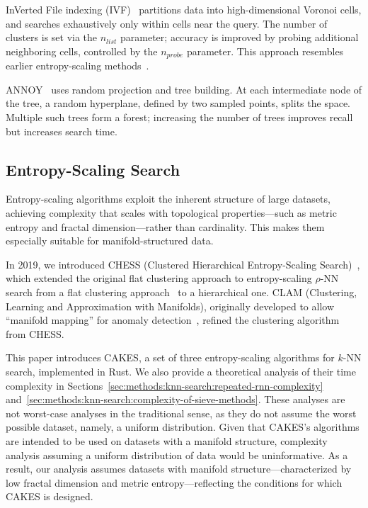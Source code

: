 InVerted File indexing (IVF)~\cite{faissivf, sacks1987multikey, kent1990signature} partitions data into high-dimensional Voronoi cells, and searches exhaustively only within cells near the query.
The number of clusters is set via the $n_{list}$ parameter; accuracy is improved by probing additional neighboring cells, controlled by the $n_{probe}$ parameter. This approach resembles earlier entropy-scaling methods~\cite{yu2015entropy}.


ANNOY~\cite{annoy} uses random projection and tree building. 
At each intermediate node of the tree, a random hyperplane, defined by two sampled points, splits the space.  Multiple such trees form a forest; increasing the number of trees improves recall but increases search time.


\subsection{Entropy-Scaling Search}
\label{sec:intoduction:entropy-scaling-search}

Entropy-scaling algorithms exploit the inherent structure of large datasets, achieving complexity that scales with topological properties—such as metric entropy and fractal dimension—rather than cardinality. This makes them especially suitable for manifold-structured data.

In 2019, we introduced CHESS (Clustered Hierarchical Entropy-Scaling Search)~\cite{ishaq2019clustered}, which extended the original flat clustering approach to entropy-scaling $\rho$-NN search from a flat clustering approach~\cite{yu2015entropy} to a hierarchical one.
CLAM (Clustering, Learning and Approximation with Manifolds), originally developed to allow ``manifold mapping'' for anomaly detection~\cite{ishaq2021clustered}, refined the clustering algorithm from CHESS.


This paper introduces CAKES, a set of three entropy-scaling algorithms for $k$-NN search, implemented in Rust. We also provide a theoretical analysis of their time complexity in Sections~\ref{sec:methods:knn-search:repeated-rnn-complexity} and~\ref{sec:methods:knn-search:complexity-of-sieve-methods}.
These analyses are not worst-case analyses in the traditional sense, as they do not assume the worst possible dataset, namely, a uniform distribution.
Given that CAKES's algorithms are intended to be used on datasets with a manifold structure, complexity analysis assuming a uniform distribution of data would be uninformative.
As a result, our analysis assumes datasets with manifold structure—characterized by low fractal dimension and metric entropy—reflecting the conditions for which CAKES is designed.


